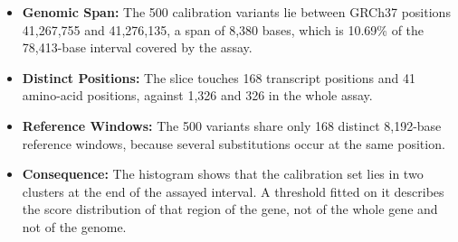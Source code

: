 \begin{itemize}
\item \textbf{Genomic Span:} The 500 calibration variants lie between GRCh37 positions 41,267,755 and 41,276,135, a span of 8,380 bases, which is 10.69\% of the 78,413-base interval covered by the assay.
\item \textbf{Distinct Positions:} The slice touches 168 transcript positions and 41 amino-acid positions, against 1,326 and 326 in the whole assay.
\item \textbf{Reference Windows:} The 500 variants share only 168 distinct 8,192-base reference windows, because several substitutions occur at the same position.
\item \textbf{Consequence:} The histogram shows that the calibration set lies in two clusters at the end of the assayed interval. A threshold fitted on it describes the score distribution of that region of the gene, not of the whole gene and not of the genome.
\end{itemize}

